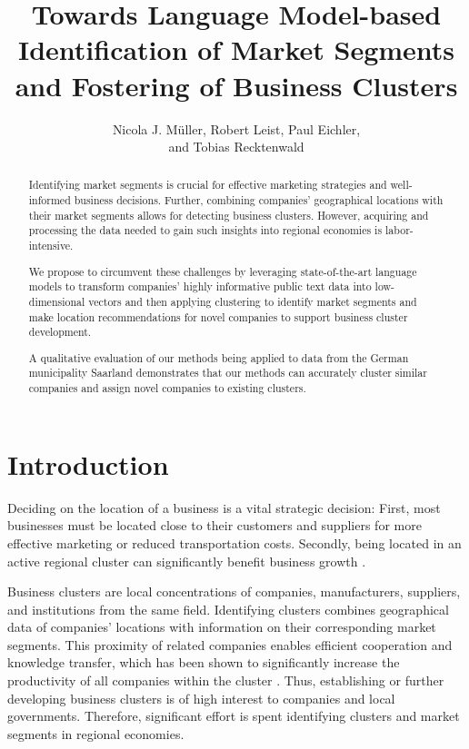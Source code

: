 \documentclass[12pt]{article}
\author{Nicola J. Müller, Robert Leist, Paul Eichler, \\and Tobias Recktenwald}
\title{Towards Language Model-based Identification of Market Segments and Fostering of Business Clusters}
\begin{document}
    \maketitle
   \begin{abstract}
   	Identifying market segments is crucial for effective marketing strategies and well-informed business decisions. Further, combining companies' geographical locations with their market segments allows for detecting business clusters. However, acquiring and processing the data needed to gain such insights into regional economies is labor-intensive. 
   	
   	We propose to circumvent these challenges by leveraging state-of-the-art language models to transform companies' highly informative public text data into low-dimensional vectors and then applying clustering to identify market segments and make location recommendations for novel companies to support business cluster development. 
   	
   	A qualitative evaluation of our methods being applied to data from the German municipality Saarland demonstrates that our methods can accurately cluster similar companies and assign novel companies to existing clusters.
   \end{abstract}
   
   
   \section{Introduction}
   Deciding on the location of a business is a vital strategic decision: First, most businesses must be located close to their customers and suppliers for more effective marketing or reduced transportation costs. Secondly, being located in an active regional cluster can significantly benefit business growth \cite{clustersandcomp,gems-model, regionaladv, clustertheory}. 
   
   Business clusters are local concentrations of companies, manufacturers, suppliers, and institutions from the same field. Identifying clusters combines geographical data of companies' locations with information on their corresponding market segments. This proximity of related companies enables efficient cooperation and knowledge transfer, which has been shown to significantly increase the productivity of all companies within the cluster \cite{clustersandcomp,gems-model, regionaladv, clustertheory}. Thus, establishing or further developing business clusters is of high interest to companies and local governments. Therefore, significant effort is spent identifying clusters and market segments in regional economies. 
   
\end{document}
